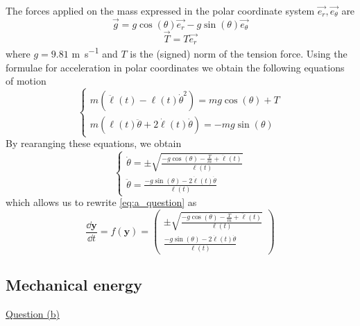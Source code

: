 The forces applied on the mass expressed in the polar coordinate system \(\vec{e_r}, \vec{e_\theta}\) are
\begin{equation}
    \vec{g} = g \cos(\theta) \vec{e_r} - g \sin(\theta) \vec{e_\theta}
\end{equation}
\begin{equation}
    \vec{T} = T \vec{e_r}
\end{equation}
where \(g=9.81\) \si{\meter\per\second} and \(T\) is the (signed) norm of the tension force. Using the formulae for acceleration in polar coordinates we obtain the following equations of motion
\begin{equation}
    \begin{cases}
        m(\ddot\ell(t) - \ell(t) \dot\theta^2) = mg\cos(\theta) + T \\
        m(\ell(t)\ddot\theta + 2\dot\ell(t) \dot\theta) = -mg\sin(\theta)
    \end{cases}
    \label{eq:motion}
\end{equation}
By rearanging these equations, we obtain
\begin{equation}
    \begin{cases}
        \dot\theta = \pm \sqrt{\frac{-g\cos(\theta) - \frac{T}{m} + \ddot\ell(t)}{\ell(t)}} \\
        \ddot\theta = \frac{-g\sin(\theta) - 2\dot\ell(t) \dot\theta}{\ell(t)}
    \end{cases}
    \label{eq:thetadot_thetadotdot}
\end{equation}
which allows us to rewrite \autoref{eq:a_question} as
\begin{equation}
    \frac{\dd \textbf{y}}{\dd t} = f(\textbf{y}) = \left(\begin{matrix}
        \pm \sqrt{\frac{-g\cos(\theta) - \frac{T}{m} + \ddot\ell(t)}{\ell(t)}} \\
        \frac{-g\sin(\theta) - 2\dot\ell(t) \dot\theta}{\ell(t)}
    \end{matrix}\right)
    \label{eq:ode}
\end{equation}

\subsection{Mechanical energy}
\underline{Question (b)}

